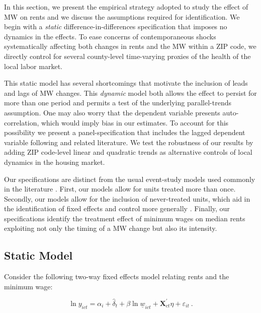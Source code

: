 
In this section, we present the empirical strategy adopted to study the effect of MW 
on rents and we discuss the assumptions required for identification. 
We begin with a \textit{static} difference-in-differences specification 
that imposes no dynamics in the effects. To ease concerns of contemporaneous shocks 
systematically affecting both changes in rents and the MW within a ZIP code, we 
directly control for several county-level time-varying proxies of the health of the 
local labor market.

This static model has several shortcomings that motivate the inclusion of leads and 
lags of MW changes. This \textit{dynamic} model both allows the effect to persist for 
more than one period and permits a test of the underlying parallel-trends assumption. 
One may also worry that the dependent variable presents auto-correlation, which would 
imply bias in our estimates. To account for this possibility we present a 
panel-specification that includes the lagged dependent variable following 
\textcite{ArellanoBond1991} and related literature. We test the robustness of our 
results by adding ZIP code-level linear and quadratic trends as alternative
controls of local dynamics in the housing market. 

Our specifications are distinct from the usual event-study models used commonly 
in the literature \parencite[discussed in, e.g.,][]{BorusyakJaravel2017, 
abraham2018}. First, our models allow for 
units treated more than once. Secondly, 
our models allow for the inclusion of never-treated units, which aid in the 
identification of fixed effects and control more generally
\parencite{BorusyakJaravel2017}. Finally, our specifications identify the treatment 
effect of minimum wages on median rents exploiting not only the timing of a MW change 
but also its intensity.
    
\subsection{Static Model}
Consider the following two-way fixed effects model relating rents and the minimum wage:

\begin{equation*} \label{eq:did_lev}
    \ln y_{ict} = \alpha_i + \hat{\delta}_t 
    			+ \beta \ln \underline{w}_{ict}
    			+ \mathbf{X}^{'}_{ct}\eta
    			+ \varepsilon_{it} \ .
\end{equation*}    

